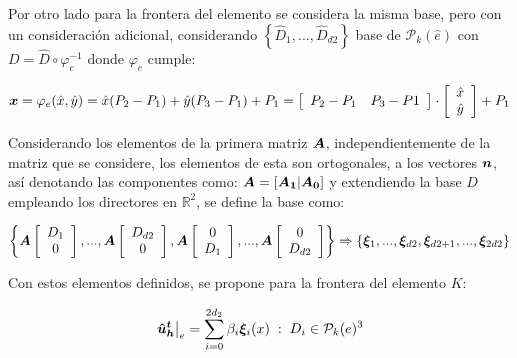 \documentclass{article}
\begin{document}
\noindent Por otro lado para la frontera del elemento se considera la misma base, pero con un consideración adicional, considerando $\left \lbrace \hat{D}_1, ..., \hat{D}_{d2} \right \rbrace$ base de $\mathcal{P}_k(\hat{e})$ con $D = \hat{D} \circ \varphi_e^{-1}$ donde $\varphi_e$ cumple:

\begin{equation*}
	\boldsymbol{x} = \varphi_e(\hat{x}, \hat{y}) = \hat{x} (P_2 - P_1) +\hat{y} (P_3 - P_1) + P_1
		     = \left [ \begin{array}{cc} P_2 - P_1 & P_3 - P1 \end{array} \right ]
		     \cdot
		      \left [ \begin{array}{cc} \hat{x} \\ \hat{y} \end{array}  \right ] + P_1
\end{equation*}

\noindent Considerando los elementos de la primera matriz $\boldsymbol{A}$, independientemente de la matriz que se considere, los elementos de esta son ortogonales, a los vectores $\boldsymbol{n}$, así denotando las componentes como: $\boldsymbol{A} = [\boldsymbol{A_1} | \boldsymbol{A_0}]$ y extendiendo la base $D$ empleando los directores en $\mathbb{R}^2$, se define la base como:

\begin{equation}
\label{eq:4}
	\left \lbrace 
	\boldsymbol{A} \left [ \begin{array}{cc} D_{1} \\ 0 \end{array}  \right ] , ... , 
	\boldsymbol{A} \left [ \begin{array}{cc} D_{d2} \\ 0 \end{array}  \right ],
	\boldsymbol{A} \left [ \begin{array}{cc} 0 \\ D_{1} \end{array}  \right ] , ... , 
	\boldsymbol{A} \left [ \begin{array}{cc} 0 \\ D_{d2} \end{array}  \right ]
	\right \rbrace
	\Rightarrow
	\left \lbrace 
	\boldsymbol{\xi}_1, ..., \boldsymbol{\xi}_{d2}, \boldsymbol{\xi}_{d2 + 1}, ..., \boldsymbol{\xi}_{2d2}
	\right \rbrace
\end{equation}

\noindent Con estos elementos definidos, se propone para la frontera del elemento $K$:

\begin{equation*}
    \left . \boldsymbol{\hat{u}^t_h} \right |_e = \sum_{i=0}^{2d_2} \beta_i \boldsymbol{\xi}_i(x)
    \hspace{1mm} : \hspace{1mm} D_i \in \mathcal{P}_k(e)^3
\end{equation*}
\end{document}

